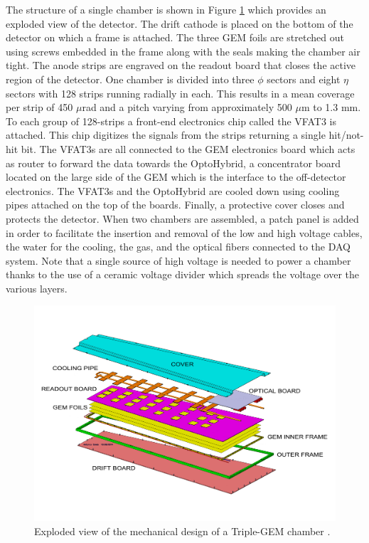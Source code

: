     The structure of a single chamber is shown in Figure \ref{fig:II-1-exploded} which provides an exploded view of the detector. The drift cathode is placed on the bottom of the detector on which a frame is attached. The three GEM foils are stretched out using screws embedded in the frame along with the seals making the chamber air tight. The anode strips are engraved on the readout board that closes the active region of the detector. One chamber is divided into three $ \phi $ sectors and eight $ \eta $ sectors with 128 strips running radially in each. This results in a mean coverage per strip of 450 $\mu$rad and a pitch varying from approximately 500 $\mu$m to 1.3 mm. To each group of 128-strips a front-end electronics chip called the VFAT3 is attached. This chip digitizes the signals from the strips returning a single hit/not-hit bit. The VFAT3s are all connected to the GEM electronics board which acts as router to forward the data towards the OptoHybrid, a concentrator board located on the large side of the GEM which is the interface to the off-detector electronics. The VFAT3s and the OptoHybrid are cooled down using cooling pipes attached on the top of the boards. Finally, a protective cover closes and protects the detector. When two chambers are assembled, a patch panel is added in order to facilitate the insertion and removal of the low and high voltage cables, the water for the cooling, the gas, and the optical fibers connected to the DAQ system. Note that a single source of high voltage is needed to power a chamber thanks to the use of a ceramic voltage divider which spreads the voltage over the various layers. \\

    \begin{figure}[t!]
      \centering
      \includegraphics[width=\textwidth]{img/II-1-gem/gem-exploded.pdf}
      \caption{Exploded view of the mechanical design of a Triple-GEM chamber \cite{Colaleo:2021453}.}
      \label{fig:II-1-exploded}
    \end{figure}

